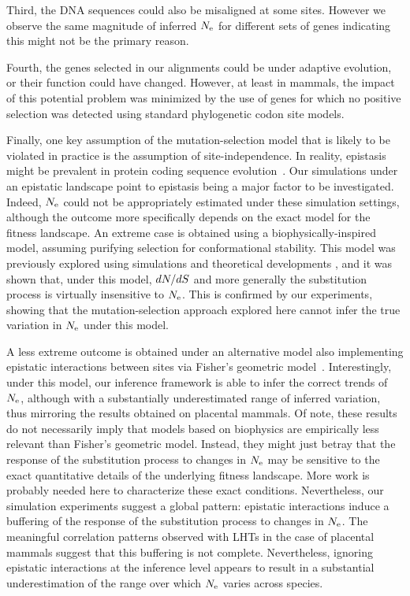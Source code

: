 Third, the \acrshort{DNA} sequences could also be misaligned at some sites.
However we observe the same magnitude of inferred $N_{\text{e}}$ for different sets of genes indicating this might not be the primary reason.

Fourth, the genes selected in our alignments could be under adaptive evolution, or their function could have changed.
However, at least in mammals, the impact of this potential problem was minimized by the use of genes for which no positive selection was detected using standard phylogenetic \gls{codon} site models.

Finally, one key assumption of the mutation-selection model that is likely to be violated in practice is the assumption of site-independence.
In reality, epistasis might be prevalent in protein coding sequence evolution~\citep{Pollock2014,Shah2015}.
Our simulations under an epistatic landscape point to epistasis being a major factor to be investigated.
Indeed, $N_{\text{e}}$ could not be appropriately estimated under these simulation settings, although the outcome more specifically depends on the exact model for the fitness landscape.
An extreme case is obtained using a biophysically-inspired model, assuming purifying selection for conformational stability.
This model was previously explored using simulations and theoretical developments \citet{Goldstein2013}, and it was shown that, under this model, $dN/dS$ and more generally the \gls{substitution} process is virtually insensitive to $N_{\text{e}}$.
This is confirmed by our experiments, showing that the mutation-selection approach explored here cannot infer the true variation in $N_{\text{e}}$ under this model.

A less extreme outcome is obtained under an alternative model also implementing epistatic interactions between sites via Fisher’s geometric model~\citep{Tenaillon2014,Blanquart2016}.
Interestingly, under this model, our inference framework is able to infer the correct trends of $N_{\text{e}}$, although with a substantially underestimated range of inferred variation, thus mirroring the results obtained on placental mammals.
Of note, these results do not necessarily imply that models based on biophysics are empirically less relevant than Fisher’s geometric model.
Instead, they might just betray that the response of the \gls{substitution} process to changes in $N_{\text{e}}$ may be sensitive to the exact quantitative details of the underlying fitness landscape.
More work is probably needed here to characterize these exact conditions.
Nevertheless, our simulation experiments suggest a global pattern: epistatic interactions induce a buffering of the response of the \gls{substitution} process to changes in $N_{\text{e}}$.
The meaningful correlation patterns observed with \acrshort{LHT}s in the case of placental mammals suggest that this buffering is not complete.
Nevertheless, ignoring epistatic interactions at the inference level appears to result in a substantial underestimation of the range over which $N_{\text{e}}$ varies across species.

